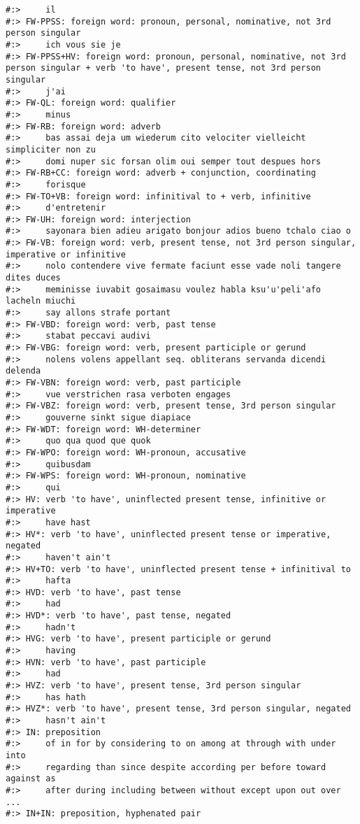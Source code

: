 \documentclass[
]{book}
\begin{document}
\begin{verbatim}
#:>     il
#:> FW-PPSS: foreign word: pronoun, personal, nominative, not 3rd person singular
#:>     ich vous sie je
#:> FW-PPSS+HV: foreign word: pronoun, personal, nominative, not 3rd person singular + verb 'to have', present tense, not 3rd person singular
#:>     j'ai
#:> FW-QL: foreign word: qualifier
#:>     minus
#:> FW-RB: foreign word: adverb
#:>     bas assai deja um wiederum cito velociter vielleicht simpliciter non zu
#:>     domi nuper sic forsan olim oui semper tout despues hors
#:> FW-RB+CC: foreign word: adverb + conjunction, coordinating
#:>     forisque
#:> FW-TO+VB: foreign word: infinitival to + verb, infinitive
#:>     d'entretenir
#:> FW-UH: foreign word: interjection
#:>     sayonara bien adieu arigato bonjour adios bueno tchalo ciao o
#:> FW-VB: foreign word: verb, present tense, not 3rd person singular, imperative or infinitive
#:>     nolo contendere vive fermate faciunt esse vade noli tangere dites duces
#:>     meminisse iuvabit gosaimasu voulez habla ksu'u'peli'afo lacheln miuchi
#:>     say allons strafe portant
#:> FW-VBD: foreign word: verb, past tense
#:>     stabat peccavi audivi
#:> FW-VBG: foreign word: verb, present participle or gerund
#:>     nolens volens appellant seq. obliterans servanda dicendi delenda
#:> FW-VBN: foreign word: verb, past participle
#:>     vue verstrichen rasa verboten engages
#:> FW-VBZ: foreign word: verb, present tense, 3rd person singular
#:>     gouverne sinkt sigue diapiace
#:> FW-WDT: foreign word: WH-determiner
#:>     quo qua quod que quok
#:> FW-WPO: foreign word: WH-pronoun, accusative
#:>     quibusdam
#:> FW-WPS: foreign word: WH-pronoun, nominative
#:>     qui
#:> HV: verb 'to have', uninflected present tense, infinitive or imperative
#:>     have hast
#:> HV*: verb 'to have', uninflected present tense or imperative, negated
#:>     haven't ain't
#:> HV+TO: verb 'to have', uninflected present tense + infinitival to
#:>     hafta
#:> HVD: verb 'to have', past tense
#:>     had
#:> HVD*: verb 'to have', past tense, negated
#:>     hadn't
#:> HVG: verb 'to have', present participle or gerund
#:>     having
#:> HVN: verb 'to have', past participle
#:>     had
#:> HVZ: verb 'to have', present tense, 3rd person singular
#:>     has hath
#:> HVZ*: verb 'to have', present tense, 3rd person singular, negated
#:>     hasn't ain't
#:> IN: preposition
#:>     of in for by considering to on among at through with under into
#:>     regarding than since despite according per before toward against as
#:>     after during including between without except upon out over ...
#:> IN+IN: preposition, hyphenated pair

\end{verbatim}
\end{document}
